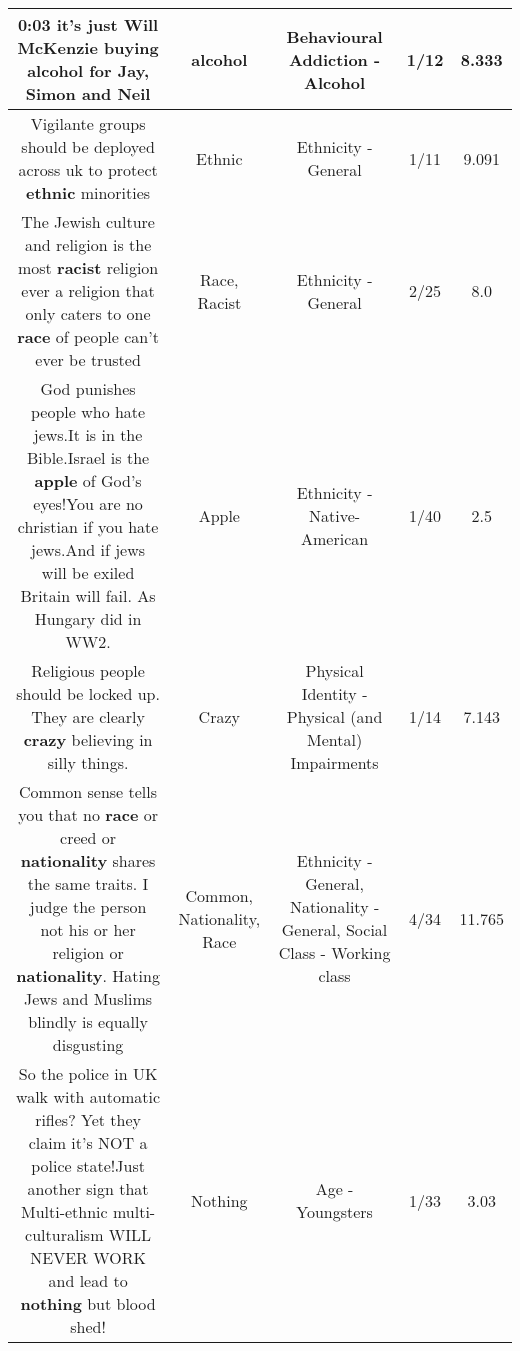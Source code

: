 \documentclass[11pt]{article}
\newlength\mylength
\begin{document}
\begin{center}
\begin{longtable}{|C{.65\mylength}|C{.30\mylength}|C{.12\mylength}|C{.12\mylength}|C{.12\mylength}|}
  \small 0:03 it's just Will McKenzie buying \textbf{alcohol} for Jay, Simon and Neil\normalsize   & alcohol & Behavioural Addiction - Alcohol & 1/12 & 8.333 \\  \hline
  \small Vigilante groups should be deployed across uk to protect \textbf{ethnic} minorities\normalsize   & Ethnic & Ethnicity - General & 1/11 & 9.091 \\  \hline
  \small The Jewish culture and religion is the most \textbf{racist} religion ever a religion that only caters to one \textbf{race} of people can't ever be trusted\normalsize   & Race, Racist & Ethnicity - General & 2/25 & 8.0 \\  \hline
  \small God punishes people who hate jews.It is in the Bible.Israel is the \textbf{apple} of God's eyes!You are no christian if you hate jews.And if jews will be exiled Britain will fail. As Hungary did in WW2.\normalsize   & Apple & Ethnicity - Native-American & 1/40 & 2.5 \\  \hline
  \small Religious people should be locked up. They are clearly \textbf{crazy} believing in silly things.\normalsize   & Crazy & Physical Identity - Physical (and Mental) Impairments & 1/14 & 7.143 \\  \hline
  \small Common sense tells you that no \textbf{race} or creed or \textbf{nationality} shares the same traits. I judge the person not his or her religion or \textbf{nationality}. Hating Jews and Muslims blindly is equally disgusting\normalsize   & Common, Nationality, Race & Ethnicity - General, Nationality - General, Social Class - Working class & 4/34 & 11.765 \\  \hline
  \small So the police in UK walk with automatic rifles? Yet they claim it's NOT a police state!Just another sign that Multi-ethnic multi-culturalism  WILL NEVER WORK and lead to \textbf{nothing} but blood shed!\normalsize   & Nothing & Age - Youngsters & 1/33 & 3.03 \\  \hline

\end{longtable}
\end{center}
\end{document}
